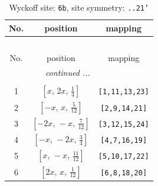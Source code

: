 \documentclass[fleqn,8pt]{jsarticle}
\begin{document}
\begin{longtable}{ccc}
\caption{Wyckoff site: {\tt 6b}, site symmetry: {\tt ..21'}}
 \\
 \hline \hline
No. & position & mapping \\ \hline \endfirsthead

\multicolumn{2}{l}{\tablename\ \thetable{}} \\
 \hline \hline
No. & position & mapping \\ \hline \endhead

 \hline \hline
\multicolumn{2}{r}{\footnotesize\it continued ...} \\ \endfoot

 \hline \hline
\multicolumn{2}{r}{} \\ \endlastfoot

1 & $\left[ x,\, 2 x,\, \frac{1}{4} \right]$ & {\tt [1,11,13,23]} \\ \hline
2 & $\left[ - x,\, x,\, \frac{5}{12} \right]$ & {\tt [2,9,14,21]} \\ \hline
3 & $\left[ - 2 x,\, - x,\, \frac{7}{12} \right]$ & {\tt [3,12,15,24]} \\ \hline
4 & $\left[ - x,\, - 2 x,\, \frac{3}{4} \right]$ & {\tt [4,7,16,19]} \\ \hline
5 & $\left[ x,\, - x,\, \frac{11}{12} \right]$ & {\tt [5,10,17,22]} \\ \hline
6 & $\left[ 2 x,\, x,\, \frac{1}{12} \right]$ & {\tt [6,8,18,20]} \\
\end{longtable}
\renewcommand{\arraystretch}{1.2}
\end{document}
